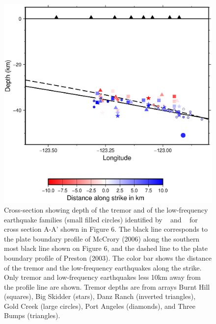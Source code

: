 \documentclass[draft]{agujournal2019}
\begin{document}
\begin{figure}
\noindent\includegraphics[width=\textwidth, trim={0.5cm 5cm 2cm 7.5cm},clip]{figures/section_strike_PWS_PWS_1.eps}
\caption{Cross-section showing depth of the tremor and of the low-frequency earthquake families (small filled circles) identified by ~ and ~ for cross section A-A' shown in Figure 6. The black line corresponds to the plate boundary profile of McCrory (2006) along the southern most black line shown on Figure 6, and the dashed line to the plate boundary profile of Preston (2003). The color bar shows the distance of the tremor and the low-frequency earthquakes along the strike. Only tremor and low-frequency earthquakes less 10km away from the profile line are shown. Tremor depths are from arrays Burnt Hill (squares), Big Skidder (stars), Danz Ranch (inverted triangles),  Gold Creek (large circles), Port Angeles (diamonds), and Three Bumps (triangles).}
\label{pngfiguresample}
\end{figure}
\end{document}
